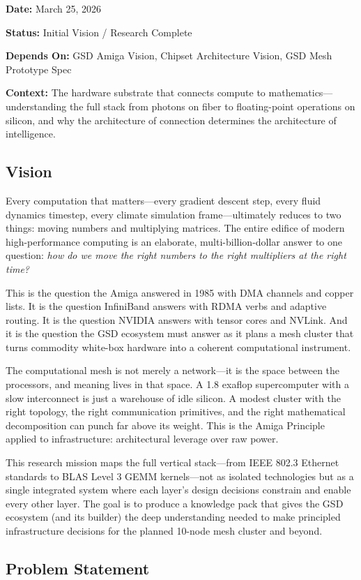 \documentclass[11pt,letterpaper]{article}
\newcommand{\metafield}[2]{\textbf{\sffamily #1} #2\par}
\begin{document}
\metafield{Date:}{March 25, 2026}
\metafield{Status:}{Initial Vision / Research Complete}
\metafield{Depends On:}{GSD Amiga Vision, Chipset Architecture Vision, GSD Mesh Prototype Spec}
\metafield{Context:}{The hardware substrate that connects compute to mathematics---understanding the full stack from photons on fiber to floating-point operations on silicon, and why the architecture of connection determines the architecture of intelligence.}

\subsection{Vision}

Every computation that matters---every gradient descent step, every fluid dynamics timestep, every climate simulation frame---ultimately reduces to two things: moving numbers and multiplying matrices. The entire edifice of modern high-performance computing is an elaborate, multi-billion-dollar answer to one question: \emph{how do we move the right numbers to the right multipliers at the right time?}

This is the question the Amiga answered in 1985 with DMA channels and copper lists. It is the question InfiniBand answers with RDMA verbs and adaptive routing. It is the question NVIDIA answers with tensor cores and NVLink. And it is the question the GSD ecosystem must answer as it plans a mesh cluster that turns commodity white-box hardware into a coherent computational instrument.

The computational mesh is not merely a network---it is the space between the processors, and meaning lives in that space. A 1.8 exaflop supercomputer with a slow interconnect is just a warehouse of idle silicon. A modest cluster with the right topology, the right communication primitives, and the right mathematical decomposition can punch far above its weight. This is the Amiga Principle applied to infrastructure: architectural leverage over raw power.

This research mission maps the full vertical stack---from IEEE 802.3 Ethernet standards to BLAS Level 3 GEMM kernels---not as isolated technologies but as a single integrated system where each layer's design decisions constrain and enable every other layer. The goal is to produce a knowledge pack that gives the GSD ecosystem (and its builder) the deep understanding needed to make principled infrastructure decisions for the planned 10-node mesh cluster and beyond.

\subsection{Problem Statement}
\end{document}
